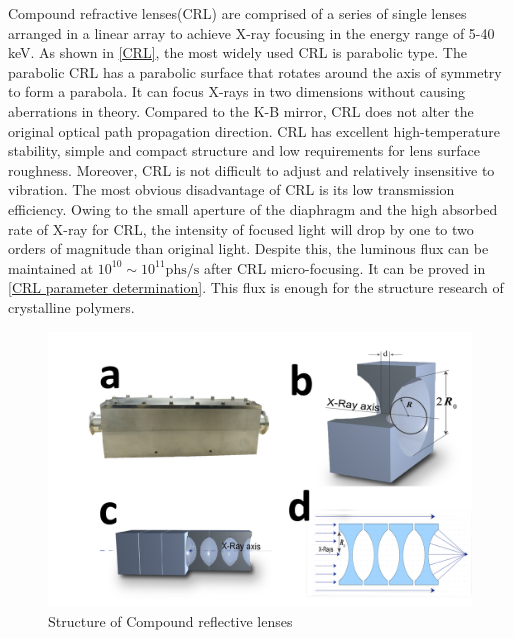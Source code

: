 \documentclass{Head}
\begin{document}
Compound refractive lenses(CRL) are comprised of a series of single lenses arranged in a linear array to achieve X-ray focusing in the energy range of 5-40 keV.
As shown in \autoref{CRL}, the most widely used CRL is parabolic type.
The parabolic CRL has a parabolic surface that rotates around the axis of symmetry to form a parabola.
It can focus X-rays in two dimensions without causing aberrations in theory.
Compared to the K-B mirror, CRL does not alter the original optical path propagation direction. CRL has excellent high-temperature stability, simple and compact structure and low requirements for lens surface roughness. Moreover, CRL is not difficult to adjust and relatively insensitive to vibration.
The most obvious disadvantage of CRL is its low transmission efficiency.
Owing to the small aperture of the diaphragm and the high absorbed rate of X-ray for CRL, the intensity of focused light will drop by one to two orders of magnitude than original light.
Despite this, the luminous flux can be maintained at $\mathrm{10^{10}\sim 10^{11} phs/s}$ after CRL micro-focusing.
It can be proved in \autoref{CRL parameter determination}.
This flux is enough for the structure research of crystalline polymers.
\begin{figure}
    \centering
    \includegraphics[scale=0.4]{Figures/Fig2CRL.png}
    \caption{Structure of Compound reflective lenses}
    \label{CRL}
\end{figure}
\end{document}
